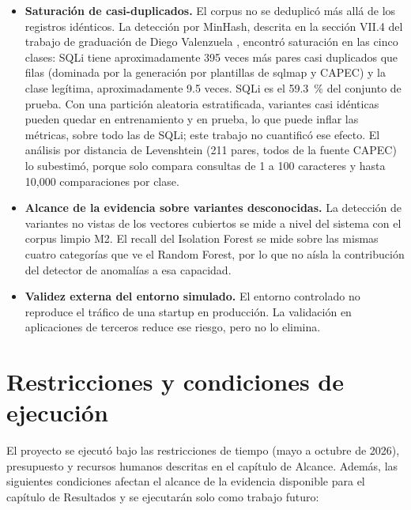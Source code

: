 \begin{itemize}
    corpus nuevo, generado con otra semilla y filtrado de la misma manera.
    \item \textbf{Saturación de casi-duplicados.} El corpus no se deduplicó más allá de los
    registros idénticos. La detección por MinHash, descrita en la sección VII.4 del trabajo de
    graduación de Diego Valenzuela \cite{valenzuela2026ia}, encontró saturación en las cinco clases: SQLi tiene
    aproximadamente 395 veces más pares casi duplicados que filas (dominada por la generación por
    plantillas de sqlmap y CAPEC) y la clase legítima, aproximadamente 9.5 veces. SQLi es el
    59.3~\% del conjunto de prueba. Con una partición aleatoria estratificada, variantes casi
    idénticas pueden quedar en entrenamiento y en prueba, lo que puede inflar las métricas, sobre
    todo las de SQLi; este trabajo no cuantificó ese efecto. El análisis por distancia de
    Levenshtein (211 pares, todos de la fuente CAPEC) lo subestimó, porque solo compara consultas de
    1 a 100 caracteres y hasta 10{,}000 comparaciones por clase.
    \item \textbf{Alcance de la evidencia sobre variantes desconocidas.} La detección de
    variantes no vistas de los vectores cubiertos se mide a nivel del sistema con el corpus limpio
    M2. El recall del Isolation Forest se mide sobre las mismas cuatro categorías que ve el Random
    Forest, por lo que no aísla la contribución del detector de anomalías a esa capacidad.
    \item \textbf{Validez externa del entorno simulado.} El entorno controlado no reproduce el
    tráfico de una startup en producción. La validación en aplicaciones de terceros reduce ese
    riesgo, pero no lo elimina.
\end{itemize}

\section{Restricciones y condiciones de ejecución}
\label{sec:met-restricciones}

El proyecto se ejecutó bajo las restricciones de tiempo (mayo a octubre de 2026), presupuesto y
recursos humanos descritas en el capítulo de Alcance. Además, las siguientes condiciones afectan
el alcance de la evidencia disponible para el capítulo de Resultados y se ejecutarán solo como
trabajo futuro:

